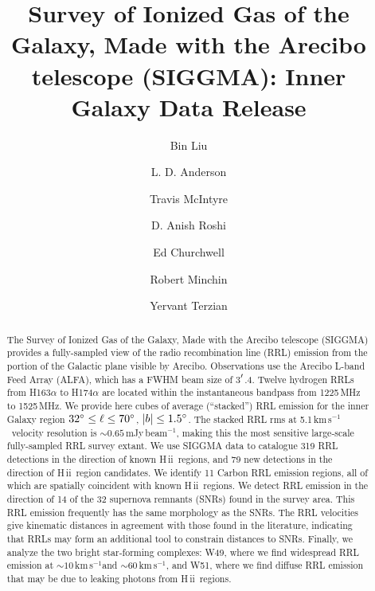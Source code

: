 \documentclass[manuscript]{aastex61}
\newcommand{\hii}{{\rm H\,}{{\sc ii}}}
\newcommand{\kms}{\,km\,s$^{-1}$}
\begin{document}
\title{Survey of Ionized Gas of the Galaxy, Made with the Arecibo telescope (SIGGMA): Inner Galaxy Data Release}

\author[0000-0002-1311-8839]{Bin Liu}
\author{L. D. Anderson}
\author{Travis McIntyre}
\author{D. Anish Roshi}
\author{Ed Churchwell}
\author{Robert Minchin}
\author{Yervant Terzian}

\begin{abstract}
The Survey of Ionized Gas of the Galaxy, Made with the Arecibo telescope (SIGGMA) provides a fully-sampled view of the radio recombination line (RRL) emission from the portion of the Galactic plane visible by Arecibo.
Observations use the Arecibo L-band Feed Array (ALFA), which has a FWHM beam size of 3$\mbox{$^\prime$}$.4. 
Twelve hydrogen RRLs from H163$\alpha$ to H174$\alpha$ are located within the instantaneous bandpass from 1225\,MHz to 1525\,MHz.
We provide here cubes of average (``stacked'') RRL emission for the inner Galaxy region $32\mbox{$^\circ$} \le \ell \le 70\mbox{$^\circ$}$, $|b|\le1.5\mbox{$^\circ$}$.
The stacked RRL rms at 5.1\kms\ velocity resolution is $\sim0.65$\,mJy\,beam$^{-1}$, making this the most sensitive large-scale fully-sampled RRL survey extant.
We use SIGGMA data to catalogue 319 RRL detections in the direction of known \hii\ regions, and 79 new detections in the direction of \hii\ region candidates. 
We identify 11 Carbon RRL emission regions, all of which are spatially coincident with known \hii\ regions. 
We detect RRL emission in the direction of 14 of the 32 supernova remnants (SNRs) found in the survey area.
This RRL emission frequently has the same morphology as the SNRs. The RRL velocities give kinematic distances in agreement with those found in the literature, indicating that RRLs may form an additional tool to constrain distances to SNRs.
Finally, we analyze the two bright star-forming complexes: W49, where we find widespread RRL emission at $\sim10$\kms and $\sim60$\kms, and W51, where we find diffuse RRL emission that may be due to leaking photons from \hii\ regions. 
\end{abstract}
\end{document}
